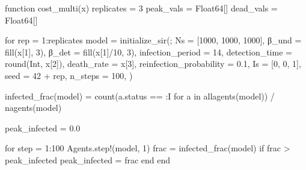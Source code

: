 \documentclass[
  12pt,
  a4paper,
  DIV=11,
  numbers=noendperiod]{scrreprt}
\newenvironment{Shaded}{\begin{snugshade}}{\end{snugshade}}
\newcommand{\ControlFlowTok}[1]{\textcolor[rgb]{0.00,0.23,0.31}{#1}}
\newcommand{\DataTypeTok}[1]{\textcolor[rgb]{0.68,0.00,0.00}{#1}}
\newcommand{\FloatTok}[1]{\textcolor[rgb]{0.68,0.00,0.00}{#1}}
\newcommand{\FunctionTok}[1]{\textcolor[rgb]{0.28,0.35,0.67}{#1}}
\newcommand{\KeywordTok}[1]{\textcolor[rgb]{0.00,0.23,0.31}{#1}}
\newcommand{\NormalTok}[1]{\textcolor[rgb]{0.00,0.23,0.31}{#1}}
\newcommand{\OperatorTok}[1]{\textcolor[rgb]{0.37,0.37,0.37}{#1}}
\begin{document}
\begin{Shaded}
\begin{Highlighting}[]
\KeywordTok{function} \FunctionTok{cost\_multi}\NormalTok{(x)}
\NormalTok{    replicates }\OperatorTok{=} \FloatTok{3}
\NormalTok{    peak\_vals }\OperatorTok{=} \DataTypeTok{Float64}\NormalTok{[]}
\NormalTok{    dead\_vals }\OperatorTok{=} \DataTypeTok{Float64}\NormalTok{[]}

    \ControlFlowTok{for}\NormalTok{ rep }\OperatorTok{=} \FloatTok{1}\OperatorTok{:}\NormalTok{replicates}
\NormalTok{        model }\OperatorTok{=} \FunctionTok{initialize\_sir}\NormalTok{(;}
\NormalTok{            Ns }\OperatorTok{=}\NormalTok{ [}\FloatTok{1000}\NormalTok{, }\FloatTok{1000}\NormalTok{, }\FloatTok{1000}\NormalTok{],}
\NormalTok{            β\_und }\OperatorTok{=} \FunctionTok{fill}\NormalTok{(x[}\FloatTok{1}\NormalTok{], }\FloatTok{3}\NormalTok{),}
\NormalTok{            β\_det }\OperatorTok{=} \FunctionTok{fill}\NormalTok{(x[}\FloatTok{1}\NormalTok{]}\OperatorTok{/}\FloatTok{10}\NormalTok{, }\FloatTok{3}\NormalTok{),}
\NormalTok{            infection\_period }\OperatorTok{=} \FloatTok{14}\NormalTok{,}
\NormalTok{            detection\_time }\OperatorTok{=} \FunctionTok{round}\NormalTok{(}\DataTypeTok{Int}\NormalTok{, x[}\FloatTok{2}\NormalTok{]),}
\NormalTok{            death\_rate }\OperatorTok{=}\NormalTok{ x[}\FloatTok{3}\NormalTok{],}
\NormalTok{            reinfection\_probability }\OperatorTok{=} \FloatTok{0.1}\NormalTok{,}
\NormalTok{            Is }\OperatorTok{=}\NormalTok{ [}\FloatTok{0}\NormalTok{, }\FloatTok{0}\NormalTok{, }\FloatTok{1}\NormalTok{],}
\NormalTok{            seed }\OperatorTok{=} \FloatTok{42} \OperatorTok{+}\NormalTok{ rep,}
\NormalTok{            n\_steps }\OperatorTok{=} \FloatTok{100}\NormalTok{,}
\NormalTok{        )}

        \FunctionTok{infected\_frac}\NormalTok{(model) }\OperatorTok{=} \FunctionTok{count}\NormalTok{(a.status }\OperatorTok{==} \OperatorTok{:}\NormalTok{I }\ControlFlowTok{for}\NormalTok{ a }\KeywordTok{in} \FunctionTok{allagents}\NormalTok{(model)) }\OperatorTok{/} \FunctionTok{nagents}\NormalTok{(model)}

\NormalTok{        peak\_infected }\OperatorTok{=} \FloatTok{0.0}

        \ControlFlowTok{for}\NormalTok{ step }\OperatorTok{=} \FloatTok{1}\OperatorTok{:}\FloatTok{100}
\NormalTok{            Agents.}\FunctionTok{step!}\NormalTok{(model, }\FloatTok{1}\NormalTok{)}
\NormalTok{            frac }\OperatorTok{=} \FunctionTok{infected\_frac}\NormalTok{(model)}
            \ControlFlowTok{if}\NormalTok{ frac }\OperatorTok{\textgreater{}}\NormalTok{ peak\_infected}
\NormalTok{                peak\_infected }\OperatorTok{=}\NormalTok{ frac}
            \ControlFlowTok{end}
        \ControlFlowTok{end}


\end{Highlighting}
\end{Shaded}
\end{document}
